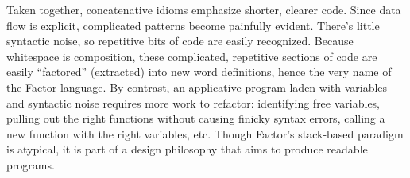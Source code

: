 Taken together, concatenative idioms emphasize shorter, clearer code.  Since
data flow is explicit, complicated patterns become painfully evident.  There's
little syntactic noise, so repetitive bits of code are easily recognized.
Because whitespace is composition, these complicated, repetitive sections of
code are easily ``factored'' (extracted) into new word definitions, hence the
very name of the Factor language.  By contrast, an applicative program laden
with variables and syntactic noise requires more work to refactor: identifying
free variables, pulling out the right functions without causing finicky syntax
errors, calling a new function with the right variables, etc.  Though Factor's
stack-based paradigm is atypical, it is part of a design philosophy that aims
to produce readable programs.


